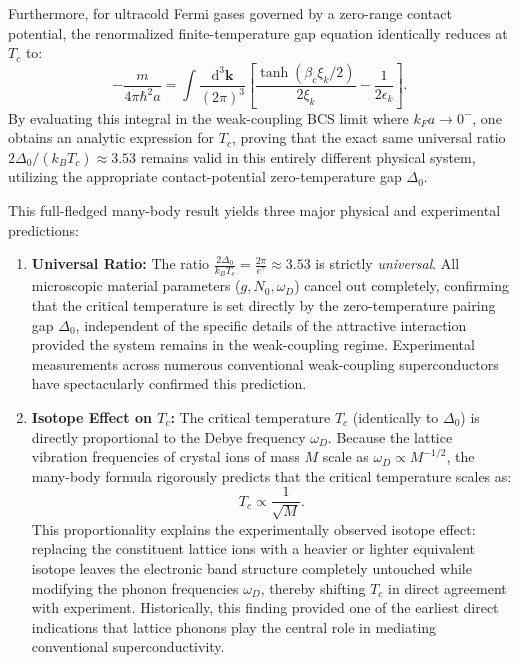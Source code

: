 Furthermore, for ultracold Fermi gases governed by a zero-range contact potential, the renormalized finite-temperature gap equation identically reduces at \( T_c \) to:
\[
    -\frac{m}{4\pi\hbar^2 a} = \int \frac{\mathrm{d}^3\mathbf{k}}{(2\pi)^3} \left[ \frac{\tanh(\beta_c \xi_k / 2)}{2\xi_k} - \frac{1}{2\epsilon_k} \right].
\]
By evaluating this integral in the weak-coupling BCS limit where \( k_F a \to 0^- \), one obtains an analytic expression for \( T_c \), proving that the exact same universal ratio \( 2\Delta_0 / (k_B T_c) \approx 3.53 \) remains valid in this entirely different physical system, utilizing the appropriate contact-potential zero-temperature gap \( \Delta_0 \).

This full-fledged many-body result yields three major physical and experimental predictions:
\begin{enumerate}
    \item \textbf{Universal Ratio:} The ratio \( \frac{2\Delta_0}{k_B T_c} = \frac{2\pi}{e^\gamma} \approx 3.53 \) is strictly \emph{universal}. All microscopic material parameters (\( g, N_0, \omega_D \)) cancel out completely, confirming that the critical temperature is set directly by the zero-temperature pairing gap \( \Delta_0 \), independent of the specific details of the attractive interaction provided the system remains in the weak-coupling regime. Experimental measurements across numerous conventional weak-coupling superconductors have spectacularly confirmed this prediction.
    \item \textbf{Isotope Effect on \( T_c \):} The critical temperature \( T_c \) (identically to \( \Delta_0 \)) is directly proportional to the Debye frequency \( \omega_D \). Because the lattice vibration frequencies of crystal ions of mass \( M \) scale as \( \omega_D \propto M^{-1/2} \), the many-body formula rigorously predicts that the critical temperature scales as:
          \[
              T_c \propto \frac{1}{\sqrt{M}}.
          \]
          This proportionality explains the experimentally observed isotope effect: replacing the constituent lattice ions with a heavier or lighter equivalent isotope leaves the electronic band structure completely untouched while modifying the phonon frequencies \( \omega_D \), thereby shifting \( T_c \) in direct agreement with experiment. Historically, this finding provided one of the earliest direct indications that lattice phonons play the central role in mediating conventional superconductivity.

\end{enumerate}
